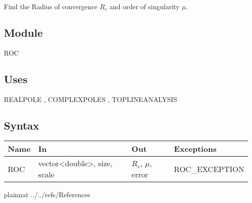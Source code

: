 \documentclass[12pt, titlepage]{article}
\begin{document}
Find the Radius of convergence $R_c$ and order of singularity $\mu$.

\subsection{Module}

ROC

\subsection{Uses}

REALPOLE ,
COMPLEXPOLES ,
TOPLINEANALYSIS 

\subsection{Syntax}

\begin{tabular}{p{3cm} p{5cm} p{3cm} >{\raggedright\arraybackslash}p{5cm}}
\toprule
\textbf{Name} & \textbf{In} & \textbf{Out} & \textbf{Exceptions} \\
\midrule
  ROC & vector<double>, size, scale &  $R_c$, $\mu$, error & ROC\_EXCEPTION \\
\bottomrule
\end{tabular}

 {plainnat}
 {../../refs/References}
\end{document}
